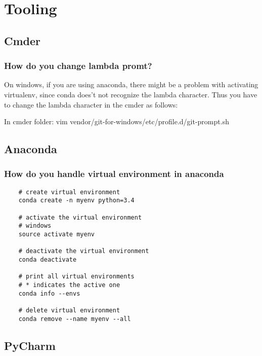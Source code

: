\chapter{   Tooling}
\graphicspath{{./images/tooling/}}

\section{Cmder}

\subsection{How do you change lambda promt?}
On windows, if you are using anaconda, there might be a problem with activating virtualenv, since conda does't not recognize the lambda character. Thus you have to change the lambda character in the cmder as follows:

In cmder folder:
vim vendor/git-for-windows/etc/profile.d/git-prompt.sh




\section{Anaconda}

\subsection{How do you handle virtual environment in anaconda}
\begin{lstlisting}
    # create virtual environment
    conda create -n myenv python=3.4

    # activate the virtual environment
    # windows
    source activate myenv

    # deactivate the virtual environment
    conda deactivate

    # print all virtual environments
    # * indicates the active one
    conda info --envs

    # delete virtual environment
    conda remove --name myenv --all
\end{lstlisting}




\section{PyCharm}

